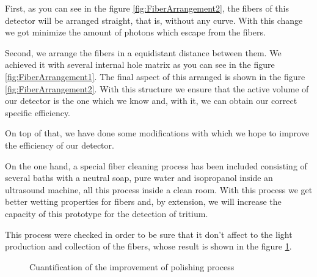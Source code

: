 First, as you can see in the figure \ref{fig:FiberArrangement2}, the fibers of this detector will be arranged straight, that is, without any curve. With this change we got minimize the amount of photons which escape from the fibers.

Second, we arrange the fibers in a equidistant distance between them. We achieved it with several internal hole matrix as you can see in the figure \ref{fig:FiberArrangement1}. The final aspect of this arranged is shown in the figure \ref{fig:FiberArrangement2}. With this structure we ensure that the active volume of our detector is the one which we know and, with it, we can obtain our correct specific efficiency.

On top of that, we have done some modifications with which we hope to improve the efficiency of our detector.

On the one hand, a special fiber cleaning process has been included consisting of several baths with a neutral soap, pure water and isopropanol inside an ultrasound machine, all this process inside a clean room. With this process we get better wetting properties for fibers and, by extension, we will increase the capacity of this prototype for the detection of tritium.

This process were checked in order to be sure that it don't affect to the light production and collection of the fibers, whose result is shown in the figure \ref{fig:CleaningProcess}.

\begin{figure}[htbp]
\centering
{}\hspace{10mm}
\caption{Cuantification of the improvement of polishing process} \label{fig:CleaningProcess}
\end{figure}

